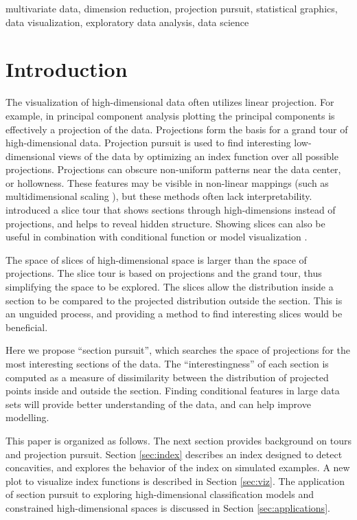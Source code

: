 \documentclass[]{interact}
\theoremstyle{plain}%
\theoremstyle{definition}
\theoremstyle{remark}
\begin{document}
\begin{keywords}
multivariate data, dimension reduction, projection pursuit, statistical
graphics, data visualization, exploratory data analysis, data science
\end{keywords}

\hypertarget{introduction}{%
\section{Introduction}\label{introduction}}

The visualization of high-dimensional data often utilizes linear
projection. For example, in principal component analysis plotting the
principal components is effectively a projection of the data.
Projections form the basis for a grand tour \citep{As85} of
high-dimensional data. Projection pursuit \citep[\citet{FT74}]{kr69} is
used to find interesting low-dimensional views of the data by optimizing
an index function over all possible projections. Projections can obscure
non-uniform patterns near the data center, or hollowness. These features
may be visible in non-linear mappings (such as multidimensional scaling
\citep{mds}), but these methods often lack interpretability.
\citet{laa2019slice} introduced a slice tour that shows sections through
high-dimensions instead of projections, and helps to reveal hidden
structure. Showing slices can also be useful in combination with
conditional function or model visualization
\citep[\citet{sliceplorer}]{JSSv081i05}.

The space of slices of high-dimensional space is larger than the space
of projections. The slice tour \citep{laa2019slice} is based on
projections and the grand tour, thus simplifying the space to be
explored. The slices allow the distribution inside a section to be
compared to the projected distribution outside the section. This is an
unguided process, and providing a method to find interesting slices
would be beneficial.

Here we propose ``section pursuit'', which searches the space of
projections for the most interesting sections of the data. The
``interestingness'' of each section is computed as a measure of
dissimilarity between the distribution of projected points inside and
outside the section. Finding conditional features in large data sets
will provide better understanding of the data, and can help improve
modelling.

This paper is organized as follows. The next section provides background
on tours and projection pursuit. Section \ref{sec:index} describes an
index designed to detect concavities, and explores the behavior of the
index on simulated examples. A new plot to visualize index functions is
described in Section \ref{sec:viz}. The application of section pursuit
to exploring high-dimensional classification models and constrained
high-dimensional spaces is discussed in Section \ref{sec:applications}.
\end{document}

